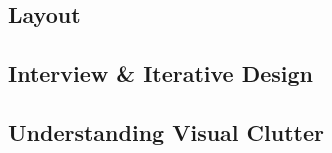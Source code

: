 





\subsection{Layout}

\subsection{Interview \& Iterative Design}

\subsection{Understanding Visual Clutter}